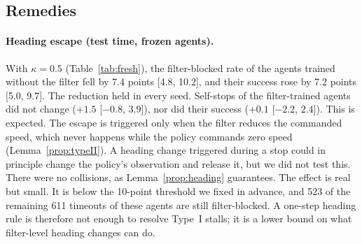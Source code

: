 \documentclass[11pt]{article}
\theoremstyle{definition}
\theoremstyle{remark}
\begin{document}
\subsection{Remedies}\label{sec:remedies}
\paragraph{Heading escape (test time, frozen agents).} With $\kappa=0.5$ (Table~\ref{tab:fresh}), the filter-blocked rate of the agents trained without the filter fell by 7.4 points [4.8, 10.2], and their success rose by 7.2 points [5.0, 9.7]. The reduction held in every seed. Self-stops of the filter-trained agents did not change ($+1.5$ [$-0.8$, $3.9$]), nor did their success ($+0.1$ [$-2.2$, $2.4$]). This is expected. The escape is triggered only when the filter reduces the commanded speed, which never happens while the policy commands zero speed (Lemma~\ref{prop:typeII}). A heading change triggered during a stop could in principle change the policy's observation and release it, but we did not test this. There were no collisions, as Lemma~\ref{prop:heading} guarantees. The effect is real but small. It is below the 10-point threshold we fixed in advance, and 523 of the remaining 611 timeouts of these agents are still filter-blocked. A one-step heading rule is therefore not enough to resolve Type~I stalls; it is a lower bound on what filter-level heading changes can do.
\end{document}
